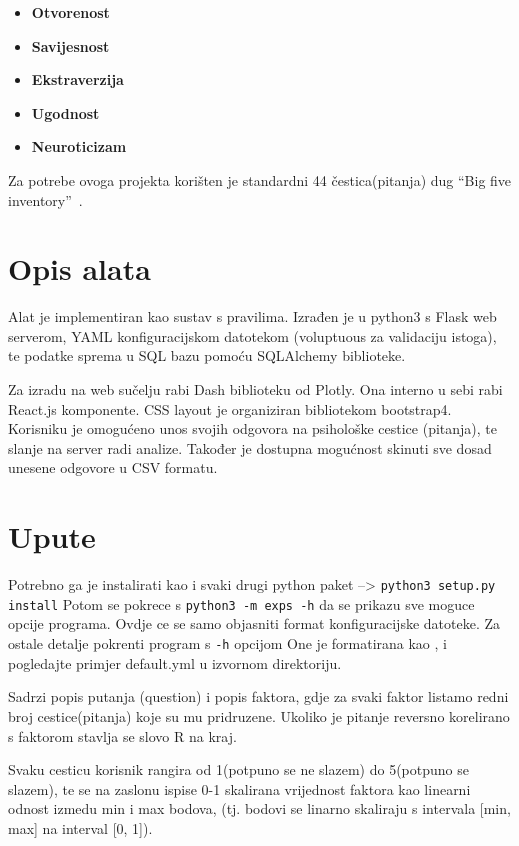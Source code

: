 \documentclass[times, utf8, seminar]{fer}
\begin{document}
\begin{itemize}
    \item \textbf{Otvorenost}
    \item \textbf{Savijesnost}
    \item \textbf{Ekstraverzija}
    \item \textbf{Ugodnost}
    \item \textbf{Neuroticizam}
\end{itemize}

Za potrebe ovoga projekta korišten je standardni 44 čestica(pitanja) dug ``Big five inventory''~\cite{john1999big}.

\chapter{Opis alata}
Alat je implementiran kao sustav s pravilima.
Izrađen je u python3 s Flask web serverom, YAML konfiguracijskom datotekom (voluptuous za validaciju istoga), te podatke sprema u SQL bazu pomoću SQLAlchemy biblioteke.

Za izradu na web sučelju rabi Dash biblioteku od Plotly.
Ona interno u sebi rabi React.js komponente.
CSS layout je organiziran bibliotekom bootstrap4.
Korisniku je omogućeno unos svojih odgovora na psihološke cestice (pitanja), te slanje na server radi analize.
Također je dostupna mogućnost skinuti sve dosad unesene odgovore u CSV formatu.
\chapter{Upute}

Potrebno ga je instalirati kao i svaki drugi python paket --> \texttt{python3 setup.py install}  Potom se pokrece s \texttt{python3 -m exps -h} da se prikazu sve moguce opcije programa.
Ovdje ce se samo objasniti format konfiguracijske datoteke. Za ostale detalje pokrenti program s \texttt{-h} opcijom
One je formatirana kao , i pogledajte primjer default.yml u izvornom direktoriju.

Sadrzi popis putanja (question) i popis faktora, gdje za svaki faktor listamo redni broj cestice(pitanja) koje su mu pridruzene. Ukoliko je pitanje reversno korelirano s faktorom stavlja se slovo R na kraj.

Svaku cesticu korisnik rangira od 1(potpuno se ne slazem) do 5(potpuno se slazem), te se na zaslonu ispise 0-1 skalirana vrijednost faktora kao linearni odnost izmedu min i max bodova, (tj. bodovi se linarno skaliraju s intervala [min, max] na interval [0, 1]).
\end{document}
